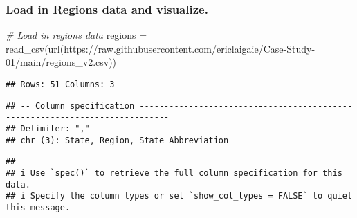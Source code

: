 \documentclass[
]{article}
\newenvironment{Shaded}{\begin{snugshade}}{\end{snugshade}}
\newcommand{\CommentTok}[1]{\textcolor[rgb]{0.56,0.35,0.01}{\textit{#1}}}
\newcommand{\FunctionTok}[1]{\textcolor[rgb]{0.00,0.00,0.00}{#1}}
\newcommand{\NormalTok}[1]{#1}
\newcommand{\OtherTok}[1]{\textcolor[rgb]{0.56,0.35,0.01}{#1}}
\newcommand{\StringTok}[1]{\textcolor[rgb]{0.31,0.60,0.02}{#1}}
\begin{document}
\hypertarget{load-in-regions-data-and-visualize.}{%
\subsubsection{Load in Regions data and
visualize.}\label{load-in-regions-data-and-visualize.}}

\begin{Shaded}
\begin{Highlighting}[]
\CommentTok{\# Load in regions data}
\NormalTok{regions }\OtherTok{=} \FunctionTok{read\_csv}\NormalTok{(}\FunctionTok{url}\NormalTok{(}\StringTok{\textquotesingle{}https://raw.githubusercontent.com/ericlaigaie/Case{-}Study{-}01/main/regions\_v2.csv\textquotesingle{}}\NormalTok{))}
\end{Highlighting}
\end{Shaded}

\begin{verbatim}
## Rows: 51 Columns: 3
\end{verbatim}

\begin{verbatim}
## -- Column specification ----------------------------------------------------------------------------
## Delimiter: ","
## chr (3): State, Region, State Abbreviation
\end{verbatim}

\begin{verbatim}
## 
## i Use `spec()` to retrieve the full column specification for this data.
## i Specify the column types or set `show_col_types = FALSE` to quiet this message.
\end{verbatim}
\end{document}
